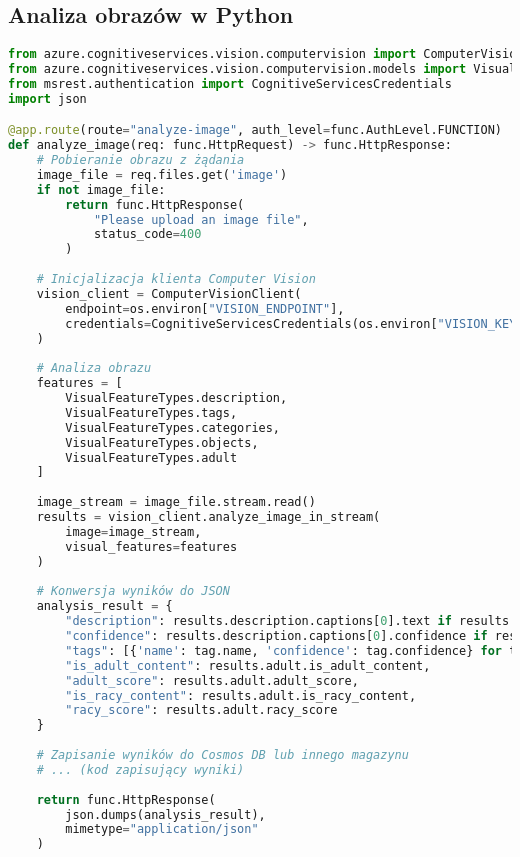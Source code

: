 \documentclass{article}
\begin{document}
\subsection{Analiza obrazów w Python}
\begin{lstlisting}[language=python]
from azure.cognitiveservices.vision.computervision import ComputerVisionClient
from azure.cognitiveservices.vision.computervision.models import VisualFeatureTypes
from msrest.authentication import CognitiveServicesCredentials
import json

@app.route(route="analyze-image", auth_level=func.AuthLevel.FUNCTION)
def analyze_image(req: func.HttpRequest) -> func.HttpResponse:
    # Pobieranie obrazu z żądania
    image_file = req.files.get('image')
    if not image_file:
        return func.HttpResponse(
            "Please upload an image file",
            status_code=400
        )
    
    # Inicjalizacja klienta Computer Vision
    vision_client = ComputerVisionClient(
        endpoint=os.environ["VISION_ENDPOINT"],
        credentials=CognitiveServicesCredentials(os.environ["VISION_KEY"])
    )
    
    # Analiza obrazu
    features = [
        VisualFeatureTypes.description,
        VisualFeatureTypes.tags,
        VisualFeatureTypes.categories,
        VisualFeatureTypes.objects,
        VisualFeatureTypes.adult
    ]
    
    image_stream = image_file.stream.read()
    results = vision_client.analyze_image_in_stream(
        image=image_stream,
        visual_features=features
    )
    
    # Konwersja wyników do JSON
    analysis_result = {
        "description": results.description.captions[0].text if results.description.captions else "",
        "confidence": results.description.captions[0].confidence if results.description.captions else 0,
        "tags": [{'name': tag.name, 'confidence': tag.confidence} for tag in results.tags],
        "is_adult_content": results.adult.is_adult_content,
        "adult_score": results.adult.adult_score,
        "is_racy_content": results.adult.is_racy_content,
        "racy_score": results.adult.racy_score
    }
    
    # Zapisanie wyników do Cosmos DB lub innego magazynu
    # ... (kod zapisujący wyniki)
    
    return func.HttpResponse(
        json.dumps(analysis_result),
        mimetype="application/json"
    )
\end{lstlisting}
\end{document}

